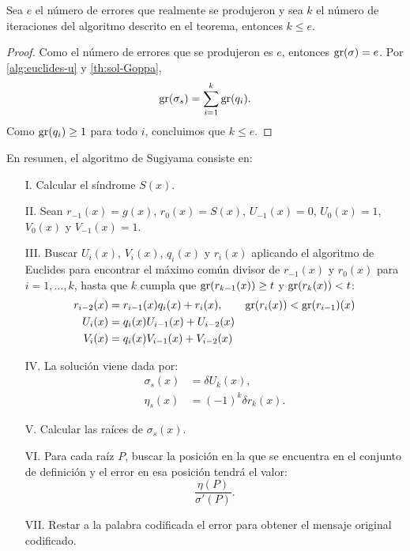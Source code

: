 \begin{corollary}
    Sea $e$ el número de errores que realmente se produjeron y sea $k$ el número de iteraciones del algoritmo descrito en el teorema, entonces $k \leq e$.
\end{corollary}

\begin{proof}
    Como el número de errores que se produjeron es $e$, entonces $\operatorname{gr}(\sigma) = e$. Por \eqref{alg:euclides-u} y \eqref{th:sol-Goppa},
    \[
        \operatorname{gr}(\sigma_s) = \sum_{i=1}^k \operatorname{gr}(q_i).
    \]
    Como $\operatorname{gr}(q_i) \geq 1$ para todo $i$, concluimos que $k \leq e$.
\end{proof}

En resumen, el algoritmo de Sugiyama consiste en:

\begin{itemize}
    \item[I.] Calcular el síndrome $S(x)$.
    \item[II.] Sean $r_{-1}(x) = g(x)$, $r_0(x) = S(x)$, $U_{-1}(x) = 0$, $U_0(x) = 1$, $V_0(x)$ y $V_{-1}(x) = 1$.
    \item[III.] Buscar $U_i(x)$, $V_i(x)$, $q_i(x)$ y $r_i(x)$ aplicando el algoritmo de Euclides para encontrar el máximo común divisor de $r_{-1}(x)$ y $r_0(x)$ para $i = 1,..., k$, hasta que $k$ cumpla que $\operatorname{gr}(r_{k-1}(x)) \geq t$ y $\operatorname{gr}(r_k(x)) < t$:
        \begin{equation*}
            \begin{split}
                r_{i-2}(x) &= r_{i-1}(x) q_i(x) + r_i(x), \qquad \operatorname{gr}(r_i(x)) < \operatorname{gr}(r_{i-1})(x)\\
                U_i(x) &= q_i(x) U_{i-1}(x) + U_{i-2}(x)\\
                V_i(x) &= q_i(x) V_{i-1}(x) + V_{i-2}(x)
            \end{split}
        \end{equation*}
    \item[IV.] La solución viene dada por:
        \begin{equation*}
            \begin{split}
                \sigma_s(x) &= \delta U_k (x), \\
                \eta_s(x) &= (-1)^k \delta r_k(x).
            \end{split}
        \end{equation*}  
    \item[V.] Calcular las raíces de $\sigma_s(x)$.
    \item[VI.] Para cada raíz $P$, buscar la posición en la que se encuentra en el conjunto de definición y el error en esa posición tendrá el valor:
        $$\frac{\eta(P)}{\sigma'(P)}.$$
    \item[VII.] Restar a la palabra codificada el error para obtener el mensaje original codificado.
\end{itemize}

